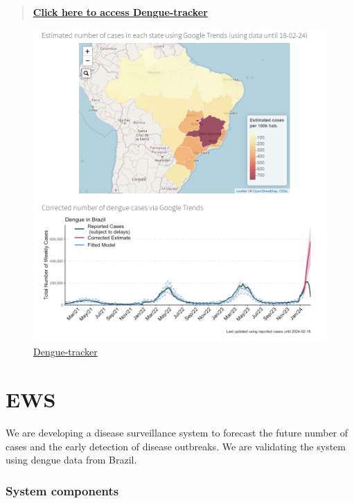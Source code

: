 \documentclass[
  letterpaper,
  DIV=11,
  numbers=noendperiod]{scrreprt}
\begin{document}
\begin{quote}
\href{https://diseasesurveillance.github.io/dengue-tracker/index.html}{\textbf{Click
here to access Dengue-tracker}}
\end{quote}

\begin{figure}

{\centering \includegraphics[width=1\textwidth,height=\textheight]{img/denguetracker.png}

}

\caption{\label{fig-denguetracker}\href{https://diseasesurveillance.github.io/dengue-tracker/index.html}{Dengue-tracker}}

\end{figure}

\hypertarget{ews}{%
\chapter{EWS}\label{ews}}

We are developing a disease surveillance system to forecast the future
number of cases and the early detection of disease outbreaks. We are
validating the system using dengue data from Brazil.

\hypertarget{system-components}{%
\subsection*{System components}\label{system-components}}
\end{document}

